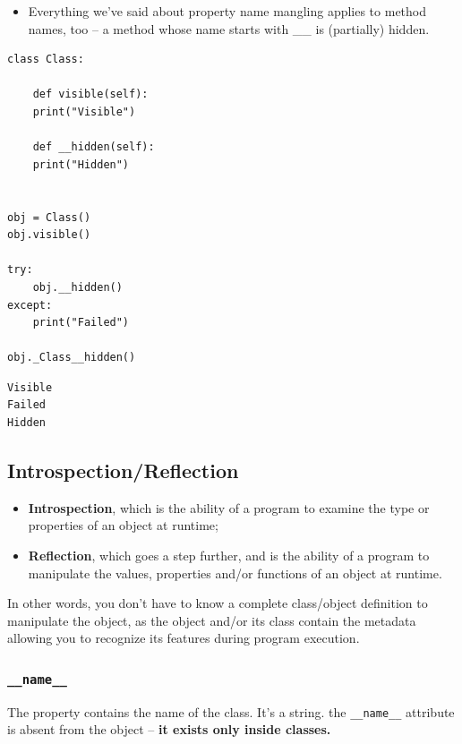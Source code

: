 \documentclass[11pt]{article}
\begin{document}
\vspace{10 mm}

\begin{itemize}
\item Everything we’ve said about property name mangling applies to method
names, too – a method whose name starts with \_\_ is (partially)
hidden.
\end{itemize}

\begin{verbatim}
class Class:

    def visible(self):
	print("Visible")

    def __hidden(self):
	print("Hidden")


obj = Class()
obj.visible()

try:
    obj.__hidden()
except:
    print("Failed")

obj._Class__hidden()

\end{verbatim}

\begin{verbatim}
Visible
Failed
Hidden
\end{verbatim}
\subsection{Introspection/Reflection}
\label{sec:orgbbb4a6c}
\begin{itemize}
\item \textbf{Introspection}, which is the ability of a program to examine the
type or properties of an object at runtime;
\item \textbf{Reflection}, which goes a step further, and is the ability of a
program to manipulate the values, properties and/or functions of an
object at runtime.
\end{itemize}

In other words, you don’t have to know a complete class/object
definition to manipulate the object, as the object and/or its class
contain the metadata allowing you to recognize its features during
program execution.

\subsubsection{\texttt{\_\_name\_\_}}
\label{sec:org2d91b2e}
The property contains the name of the class. It’s a string. the
\texttt{\_\_name\_\_} attribute is absent from the object – \textbf{it exists only inside
classes.}
\end{document}
